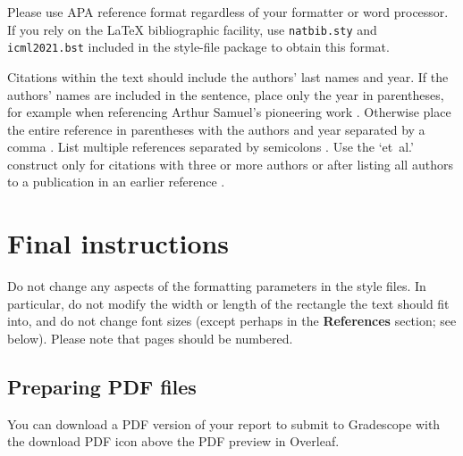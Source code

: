 \documentclass{article}
\begin{document}
Please use APA reference format regardless of your formatter
or word processor. If you rely on the \LaTeX\/ bibliographic
facility, use \texttt{natbib.sty} and \texttt{icml2021.bst}
included in the style-file package to obtain this format.

Citations within the text should include the authors' last names and
year. If the authors' names are included in the sentence, place only
the year in parentheses, for example when referencing Arthur Samuel's
pioneering work . Otherwise place the entire
reference in parentheses with the authors and year separated by a
comma \cite{Samuel59}. List multiple references separated by
semicolons \cite{kearns89,Samuel59,mitchell80}. Use the `et~al.'
construct only for citations with three or more authors or after
listing all authors to a publication in an earlier reference \cite{MachineLearningI}.


\section{Final instructions}

Do not change any aspects of the formatting parameters in the style files.  In
particular, do not modify the width or length of the rectangle the text should
fit into, and do not change font sizes (except perhaps in the
\textbf{References} section; see below). Please note that pages should be
numbered.


\subsection{Preparing PDF files}

You can download a PDF version of your report to submit to Gradescope with the download PDF icon above the PDF preview in Overleaf.







\end{document}
